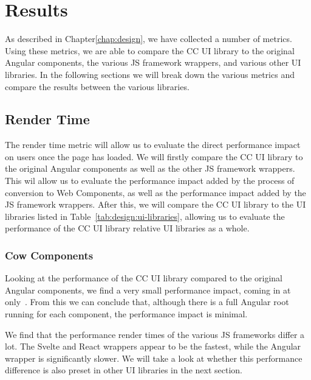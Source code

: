\chapter{Results}\label{chap:results}
As described in Chapter\ref{chap:design}, we have collected a number of metrics. Using these metrics, we are able to compare the CC UI library to the original Angular components, the various JS framework wrappers, and various other UI libraries. In the following sections we will break down the various metrics and compare the results between the various libraries.

\section{Render Time}
The render time metric will allow us to evaluate the direct performance impact on users once the page has loaded. We will firstly compare the CC UI library to the original Angular components as well as the other JS framework wrappers. This wil allow us to evaluate the performance impact added by the process of conversion to Web Components, as well as the performance impact added by the JS framework wrappers. After this, we will compare the CC UI library to the UI libraries listed in Table~\ref{tab:design:ui-libraries}, allowing us to evaluate the performance of the CC UI library relative UI libraries as a whole.

\subsection{Cow Components}
Looking at the performance of the CC UI library compared to the original Angular components, we find a very small performance impact, coming in at only~. From this we can conclude that, although there is a full Angular root running for each component, the performance impact is minimal.

We find that the performance render times of the various JS frameworks differ a lot. The Svelte and React wrappers appear to be the fastest, while the Angular wrapper is significantly slower. We will take a look at whether this performance difference is also preset in other UI libraries in the next section.

